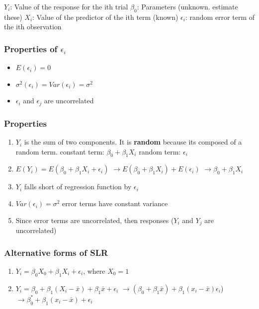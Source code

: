 \documentclass[11pt]{article}
\begin{document}
\(Y_i\): Value of the response for the ith trial
\(\beta_0\): Parameters (unknown. estimate these)
\(X_i\): Value of the predictor of the ith term (known)
\(\epsilon_i\): random error term of the ith observation
\subsubsection{Properties of \(\epsilon_i\)}
\label{sec:orge0df02b}
\begin{itemize}
\item \(E(\epsilon_i) = 0\)
\item \(\sigma^2(\epsilon_i) = Var(\epsilon_i) = \sigma^2\)
\item \(\epsilon_i\) and \(\epsilon_j\) are uncorrelated
\end{itemize}
\subsubsection{Properties}
\label{sec:org4091b5f}
\begin{enumerate}
\item \(Y_i\) is the sum of two components. It is \textbf{random} because its composed of a
random term.
constant term: \(\beta_0 + \beta_1 X_i\)
random term: \(\epsilon_i\)
\item \(E(Y_i) = E(\beta_0 + \beta_1 X_i + \epsilon_i)\)
\(\to E(\beta_0 + \beta_1 X_i) + E(\epsilon_i)\)
\(\to \beta_0 + \beta_1 X_i\)
\item \(Y_i\) falls short of regression function by \(\epsilon_i\)
\item \(Var(\epsilon_i) = \sigma^2\) error terms have constant variance
\item Since error terms are uncorrelated, then responses (\(Y_i\) and \(Y_j\) are
uncorrelated)
\end{enumerate}

\subsubsection{Alternative forms of SLR}
\label{sec:org1dd9b57}
\begin{enumerate}
\item \(Y_i = \beta_0 X_0 + \beta_1 X_i + \epsilon_i\), where \(X_0 = 1\)
\item \(Y_i = \beta_0 + \beta_1 (X_i - \bar{x}) + \beta_1 \bar{x} + \epsilon_i\)
\(\to (\beta_0 + \beta_1 \bar{x}) + \beta_1 (x_i - \bar{x}) \epsilon_i\))
\(\to \beta_0^* + \beta_1(x_i - \bar{x}) + \epsilon_i\)
\end{enumerate}
\end{document}
